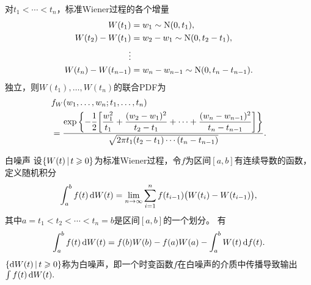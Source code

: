 对$t_1<\cdots<t_n$，标准Wiener过程的各个增量
\begin{align*}
	W(t_1)&=w_1\sim\operatorname{N}(0,t_1),\\
	W(t_2)-W(t_1)&=w_2-w_1\sim\operatorname{N}(0,t_2-t_1),\\
	\vdots\\
	W(t_n)-W(t_{n-1})&=w_n-w_{n-1}\sim\operatorname{N}(0,t_n-t_{n-1}).
\end{align*}
独立，则$W(t_1),\ldots,W(t_n)$的联合PDF为 
\begin{align*}
	&f_W(w_1,\ldots,w_n;t_1,\ldots,t_n)\\
	&=\frac{\exp\bigg\{{-\dfrac12\biggl[\dfrac{w_1^2}{t_1}+\dfrac{(w_2-w_1)^2}{t_2-t_1}+\cdots+\dfrac{(w_n-w_{n-1})^2}{t_n-t_{n-1}}\biggr]\bigg\}}}{\sqrt{2\pi t_1(t_2-t_1)\cdots(t_n-t_{n-1})}}.
\end{align*}
\begin{example}{白噪声}{}
	设$\left\{W(t)\,\middle\vert\,t\geqslant 0\right\}$为标准Wiener过程，令$f$为区间$[a,b]$有连续导数的函数，定义随机积分
	\[
		\int_a^bf(t)\mathop{}\!\mathrm{d} W(t)=\lim_{n\to\infty}\sum_{i=1}^n f(t_{i-1})\bigl(W(t_i)-W(t_{i-1})\bigr),
	\]
	其中$a=t_1<t_2<\cdots<t_n=b$是区间$[a,b]$的一个划分。%
	有
	\[
		\int_a^bf(t)\mathop{}\!\mathrm{d} W(t)=f(b)W(b)-f(a)W(a)-\int_a^bW(t)\mathop{}\!\mathrm{d} f(t).
	\]
	$\left\{\mathop{}\!\mathrm{d} W(t)\,\middle\vert\,t\geqslant 0\right\}$称为白噪声，即一个时变函数$f$在白噪声的介质中传播导致输出$\textstyle\int f(t)\mathop{}\!\mathrm{d} W(t).$
\end{example}

